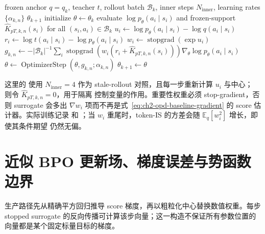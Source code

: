 \documentclass[lang=cn,scheme=chinese,openany]{../book/elegantbook}
\newcommand{\sg}{\operatorname{stopgrad}}
\begin{document}
\begin{algorithm}[ht]
\caption{Token-IS OPD baseline\\{\small\textit{Semantics: 复用 anchor rollout；仅修正 prefix 条件下的 token 测度}}}
\begin{algorithmic}[1]
\Require frozen anchor $q=q_k$, teacher $t$, rollout batch $\mathcal B_k$, inner steps $N_{\mathrm{inner}}$, learning rates $\{\alpha_{k,n}\}$
\Ensure $\theta_{k+1}$
\State initialize $\theta\gets\theta_k$
    \State evaluate $\log p_\theta(a_i\mid s_i)$ and frozen-support $\widehat K_{pT,k,n}(s_i)$ for all $(s_i,a_i)\in\mathcal B_k$
    \State $u_i\gets\log p_\theta(a_i\mid s_i)-\log q(a_i\mid s_i)$
    \State $r_i\gets\log t(a_i\mid s_i)-\log p_\theta(a_i\mid s_i)$
    \State $w_i\gets\sg(\exp u_i)$
    \State $g_{k,n}\gets-|\mathcal B_k|^{-1}\sum_i\sg(w_i(r_i+\widehat K_{pT,k,n}(s_i)))\nabla_\theta\log p_\theta(a_i\mid s_i)$
    \State $\theta\gets\operatorname{OptimizerStep}(\theta,g_{k,n};\alpha_{k,n})$
\EndFor
\State \Return $\theta_{k+1}\gets\theta$
\end{algorithmic}
\end{algorithm}

这里的  使用 $N_{\mathrm{inner}}=4$ 作为 stale-rollout 对照，且每一步重新计算 $u_i$ 与中心； 则令 $\widehat K_{pT,k,n}=0$，用于隔离 控制变量的作用。重要性权重必须 stop-gradient，否则 surrogate 会多出 $\nabla w_i$ 项而不再是式~\eqref{eq:ch2-opd-baseline-gradient} 的 score 估计器。实际训练记录  和 ；当 $w_i$ 重尾时，token-IS 的方差会随 $\mathbb E_q[w_i^2]$ 增长，即使其条件期望 仍然无偏。



\section{近似 BPO 更新场、梯度误差与势函数边界}
\label{opd:approximate-field}

生产路径先从精确平方回归推导 score 梯度，再以粗粒化中心替换数值权重。每步 stopped surrogate 的反向传播可计算该步向量；这一构造不保证所有参数位置的向量都是某个固定标量目标的梯度。
\end{document}
